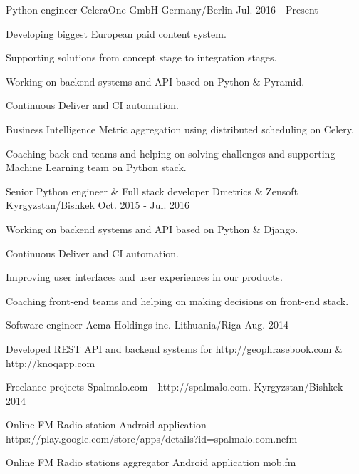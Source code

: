 \begin{cventries}
  \cventry
    {Python engineer}
    {CeleraOne GmbH}
    {Germany/Berlin}
    {Jul. 2016 - Present}
    {
      \begin{cvitems}
        \item {Developing biggest European paid content system.}
        \item {Supporting solutions from concept stage to integration stages.}
        \item {Working on backend systems and API based on Python \& Pyramid.}
        \item {Continuous Deliver and CI automation.}
        \item {Business Intelligence Metric aggregation using distributed scheduling on Celery.}
        \item {Coaching back-end teams and helping on solving challenges and supporting Machine Learning team on Python stack.}
      \end{cvitems}
    }
  \cventry
    {Senior Python engineer \& Full stack developer}
    {Dmetrics \& Zensoft}
    {Kyrgyzstan/Bishkek}
    {Oct. 2015 - Jul. 2016}
    {
      \begin{cvitems}
        \item {Working on backend systems and API based on Python \& Django.}
        \item {Continuous Deliver and CI automation.}
        \item {Improving user interfaces and user experiences in our products.}
        \item {Coaching front-end teams and helping on making decisions on front-end stack.}
      \end{cvitems}
    }
  \cventry
    {Software engineer}
    {Acma Holdings inc.}
    {Lithuania/Riga}
    {Aug. 2014}
    {
      \begin{cvitems}
        \item {Developed REST API and backend systems for http://geophrasebook.com \& http://knoqapp.com}
      \end{cvitems}
    }
  \cventry
    {Freelance projects}
    {Spalmalo.com - http://spalmalo.com.}
    {Kyrgyzstan/Bishkek}
    {2014}
    {
      \begin{cvitems}
        \item {Online FM Radio station Android application https://play.google.com/store/apps/details?id=spalmalo.com.nefm}
        \item {Online FM Radio stations aggregator Android application mob.fm}

\end{cvitems}}
\end{cventries}
